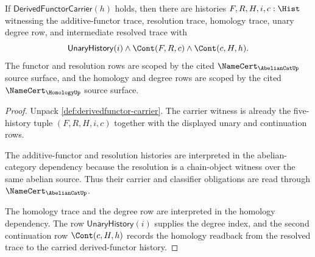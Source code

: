 \begin{theorem}\label{thm:derivedfunctor-resolution-source}
If $\mathsf{DerivedFunctorCarrier}(h)$ holds, then there are histories $F,R,H,i,c:\Hist$ witnessing the additive-functor trace, resolution trace, homology trace, unary degree row, and intermediate resolved trace with
$$
\mathsf{UnaryHistory}(i)\wedge \Cont(F,R,c)\wedge \Cont(c,H,h).
$$
The functor and resolution rows are scoped by the cited $\NameCert_{\AbelianCatUp}$ source surface, and the homology and degree rows are scoped by the cited $\NameCert_{\HomologyUp}$ source surface.
\end{theorem}
\begin{proof}
Unpack \autoref{def:derivedfunctor-carrier}. The carrier witness is already the five-history tuple $(F,R,H,i,c)$ together with the displayed unary and continuation rows.

The additive-functor and resolution histories are interpreted in the abelian-category dependency because the resolution is a chain-object witness over the same abelian source. Thus their carrier and classifier obligations are read through $\NameCert_{\AbelianCatUp}$.

The homology trace and the degree row are interpreted in the homology dependency. The row $\mathsf{UnaryHistory}(i)$ supplies the degree index, and the second continuation row $\Cont(c,H,h)$ records the homology readback from the resolved trace to the carried derived-functor history.
\end{proof}

